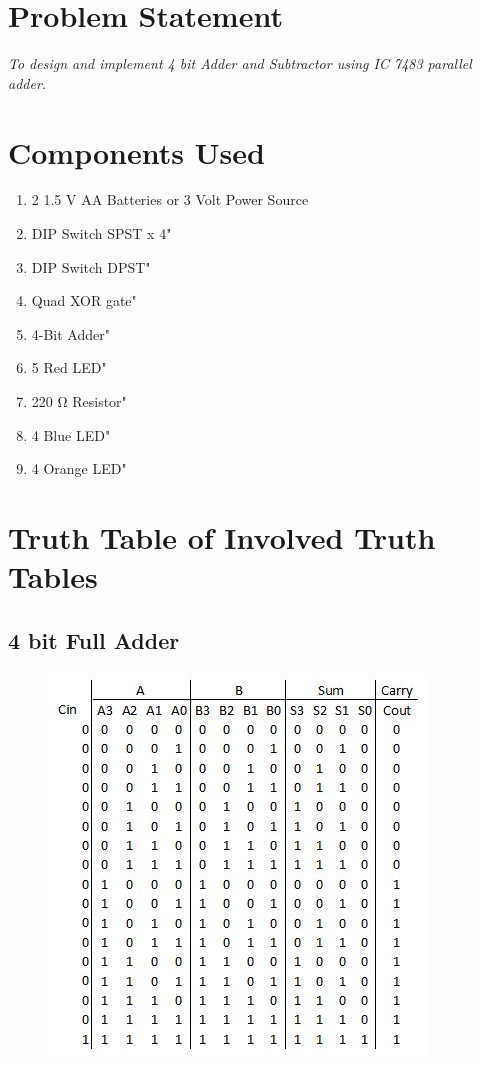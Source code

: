 \documentclass[11pt]{article}
\begin{document}
\tableofcontents
\thispagestyle{empty}
\clearpage


\setcounter{page}{1}
\section{Problem Statement}
\textit{To design and implement 4 bit Adder and Subtractor using IC 7483 parallel adder.}

\section{Components Used}
\begin{enumerate}
	\item 2 1.5 V AA Batteries or 3 Volt Power Source
	\item DIP Switch SPST x 4"
	\item DIP Switch DPST"
	\item Quad XOR gate"
	\item 4-Bit Adder"
	\item 5 Red LED"
	\item 220 Ω Resistor"
	\item 4 Blue LED"
	\item 4 Orange LED"
\end{enumerate}

\section{Truth Table of Involved Truth Tables}
\subsection{4 bit Full Adder}
\begin{figure}[H]
\centering
\includegraphics[scale=0.9]{4-bit-adder-Turth-Table.jpg}
\caption{}
\end{figure}
\end{document}
